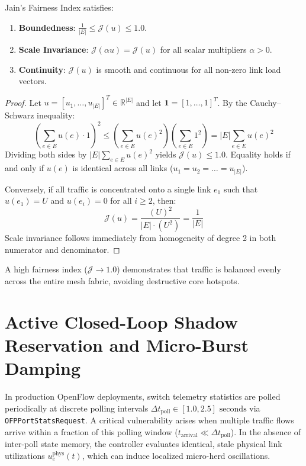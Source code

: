 \begin{theorem}
Jain's Fairness Index satisfies:
\begin{enumerate}
    \item \textbf{Boundedness}: $\frac{1}{|E|} \le \mathcal{J}(u) \le 1.0$.
    \item \textbf{Scale Invariance}: $\mathcal{J}(\alpha u) = \mathcal{J}(u)$ for all scalar multipliers $\alpha > 0$.
    \item \textbf{Continuity}: $\mathcal{J}(u)$ is smooth and continuous for all non-zero link load vectors.
\end{enumerate}
\end{theorem}

\begin{proof}
Let $u = [u_1, \dots, u_{|E|}]^T \in \mathbb{R}^{|E|}$ and let $\mathbf{1} = [1, \dots, 1]^T$. By the Cauchy--Schwarz inequality:
\begin{equation}
    \left( \sum_{e \in E} u(e) \cdot 1 \right)^2 \le \left( \sum_{e \in E} u(e)^2 \right) \left( \sum_{e \in E} 1^2 \right) = |E| \sum_{e \in E} u(e)^2
\end{equation}
Dividing both sides by $|E| \sum_{e \in E} u(e)^2$ yields $\mathcal{J}(u) \le 1.0$. Equality holds if and only if $u(e)$ is identical across all links ($u_1 = u_2 = \dots = u_{|E|}$).

Conversely, if all traffic is concentrated onto a single link $e_1$ such that $u(e_1) = U$ and $u(e_i) = 0$ for all $i \ge 2$, then:
\begin{equation}
    \mathcal{J}(u) = \frac{(U)^2}{|E| \cdot (U^2)} = \frac{1}{|E|}
\end{equation}
Scale invariance follows immediately from homogeneity of degree 2 in both numerator and denominator.
\end{proof}

A high fairness index ($\mathcal{J} \to 1.0$) demonstrates that traffic is balanced evenly across the entire mesh fabric, avoiding destructive core hotspots.

\section{Active Closed-Loop Shadow Reservation and Micro-Burst Damping}
\label{sec:shadow_reservation_math}
In production OpenFlow deployments, switch telemetry statistics are polled periodically at discrete polling intervals $\Delta t_{\text{poll}} \in [1.0, 2.5]\text{ seconds}$ via \texttt{OFPPortStatsRequest}. A critical vulnerability arises when multiple traffic flows arrive within a fraction of this polling window ($t_{\text{arrival}} \ll \Delta t_{\text{poll}}$). In the absence of inter-poll state memory, the controller evaluates identical, stale physical link utilizations $u_e^{\text{phys}}(t)$, which can induce localized micro-herd oscillations.

